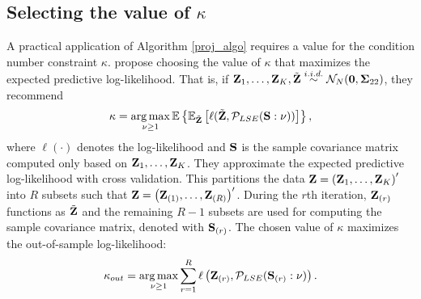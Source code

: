 \documentclass[11pt]{article}
\newcommand{\E}{\mathbb{E}}
\DeclareMathOperator*{\argmax}{arg\,max}
\theoremstyle{definition}
\theoremstyle{definition}
\def\bSigma{{\bf \Sigma}}
\def\Z{{\bf Z}}
\def\SS{{\bf S}}
\def\E{{\mathbb E}}
\begin{document}
\subsection{Selecting the value of $\kappa$}
\label{condSelection}
A practical application of Algorithm \ref{proj_algo} requires a value for the condition number constraint $\kappa$.
 \cite{won2006maximum} propose choosing the value of $\kappa$ that maximizes the expected predictive log-likelihood. That is, if $\Z_1, \dots, \Z_K,  \tilde{\Z}\stackrel{i.i.d.}{\sim} \mathcal{N}_{N}(\boldsymbol{0}, \bSigma_{22})$, they recommend $$\kappa = \argmax_{\nu \geq 1} \E \left\{ \E_{\tilde{\Z}} \left[  \ell(\tilde{\Z},  \mathcal{P}_{LSE}(\SS : \nu)) \right] \right\},$$ where $\ell(\cdot)$ denotes the log-likelihood  and $\SS$ is the sample covariance matrix computed only based on $\Z_1, \dots, \Z_K$. They approximate the expected predictive log-likelihood with cross validation. This partitions the data $\Z = \left(\Z_{1}, \dots, \Z_{K}\right)'$ into $R$ subsets such that  $\Z = \left(\Z_{(1)}, \dots, \Z_{(R)}\right)'$. During the $r$th iteration, $\Z_{(r)}$ functions as $\tilde{\Z}$ and the remaining $R-1$ subsets are used for computing the sample covariance matrix, denoted  with $\SS_{(r)}$. 
The chosen value of $\kappa$ maximizes the out-of-sample log-likelihood:
 \begin{align}
\kappa_{out} = \argmax_{\nu \geq 1} \sum_{r=1}^R \ell\left( \Z_{(r)}, \mathcal{P}_{LSE}(\SS_{(r)} : \nu)\right).
\label{kappa_out}
\end{align}
\end{document}
